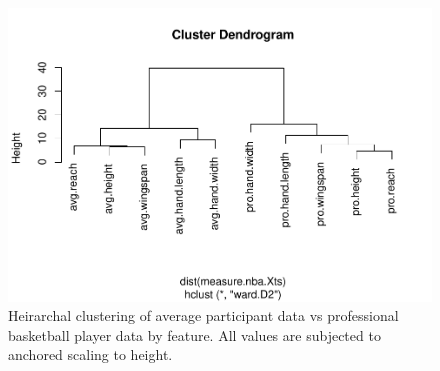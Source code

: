 \documentclass[]{article}
\begin{document}
\begin{figure}
\centering
\includegraphics{project-measure-writeup_files/figure-latex/appendix-cluster-analysis-1.pdf}
\caption{Heirarchal clustering of average participant data vs
professional basketball player data by feature. All values are subjected
to anchored scaling to height.}
\end{figure}
\end{document}

